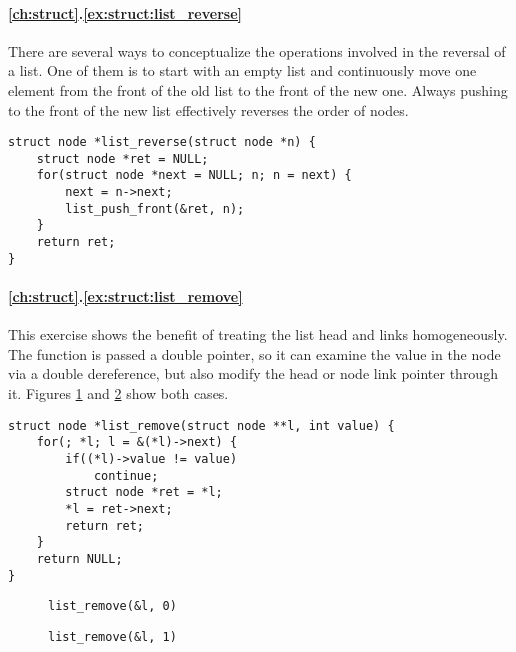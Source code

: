 \paragraph{\ref{ch:struct}.\ref{ex:struct:list_reverse}}

There are several ways to conceptualize the operations involved in the reversal
of a list.  One of them is to start with an empty list and continuously move one
element from the front of the old list to the front of the new one.  Always
pushing to the front of the new list effectively reverses the order of nodes.

\begin{lstlisting}[style=c]
struct node *list_reverse(struct node *n) {
    struct node *ret = NULL;
    for(struct node *next = NULL; n; n = next) {
        next = n->next;
        list_push_front(&ret, n);
    }
    return ret;
}
\end{lstlisting}

\paragraph{\ref{ch:struct}.\ref{ex:struct:list_remove}}

This exercise shows the benefit of treating the list head and links
homogeneously.  The function is passed a double pointer, so it can examine the
value in the node via a double dereference, but also modify the head or node
link pointer through it.  Figures \ref{fig:sol:list_remove0} and
\ref{fig:sol:list_remove1} show both cases.

\begin{lstlisting}[style=c]
struct node *list_remove(struct node **l, int value) {
    for(; *l; l = &(*l)->next) {
        if((*l)->value != value)
            continue;
        struct node *ret = *l;
        *l = ret->next;
        return ret;
    }
    return NULL;
}
\end{lstlisting}

\begin{figure}[p]
    \centering
    
    \caption{\texttt{list\_remove(\&l, 0)}}
    \label{fig:sol:list_remove0}
\end{figure}

\begin{figure}[p]
    \centering
    
    \caption{\texttt{list\_remove(\&l, 1)}}
    \label{fig:sol:list_remove1}
\end{figure}

